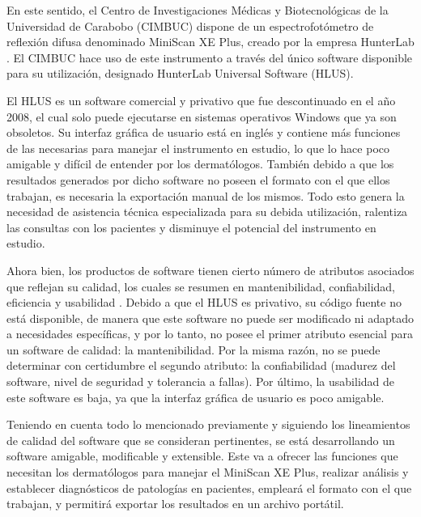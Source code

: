 \documentclass[conference]{IEEEtran}
\begin{document}
En este sentido, el Centro de Investigaciones M\'{e}dicas y Biotecnol\'{o}gicas de la Universidad de Carabobo \mbox{(CIMBUC)} dispone de un espectrofot\'{o}metro de reflexi\'{o}n difusa \mbox{denominado} MiniScan XE Plus, creado por la empresa HunterLab \cite{HunterLab}. El CIMBUC hace uso de este instrumento a trav\'{e}s del \'{u}nico software disponible para su utilizaci\'{o}n, designado HunterLab Universal Software (HLUS)\cite{HunterLab-manual}.

El HLUS es un software \mbox{comercial} y privativo que fue descontinuado en el a\~{n}o 2008, el cual solo puede ejecutarse en \mbox{sistemas} \mbox{operativos} Windows que ya son obsoletos. Su interfaz gr\'{a}fica de usuario est\'{a} en ingl\'{e}s y contiene m\'{a}s funciones de las necesarias para manejar el instrumento en estudio, lo que lo hace poco amigable y dif\'{i}cil de entender por los dermat\'{o}logos. Tambi\'{e}n debido a que los resultados generados por dicho software no poseen el formato con el que ellos trabajan, es necesaria la exportaci\'{o}n manual de los mismos. Todo esto genera la necesidad de asistencia t\'{e}cnica especializada para su debida utilizaci\'{o}n, ralentiza las consultas con los pacientes y disminuye el potencial del instrumento en estudio.

Ahora bien, los productos de software tienen cierto n\'{u}mero de atributos asociados que reflejan su calidad, los cuales se resumen en mantenibilidad, confiabilidad, eficiencia y usabilidad \cite{Sommerville}. Debido a que el HLUS es \mbox{privativo}, su c\'{o}digo fuente no est\'{a} disponible, de manera que este software no puede ser modificado ni adaptado a necesidades espec\'{i}ficas, y por lo tanto, no posee el primer atributo esencial para un software de calidad: la mantenibilidad. Por la misma raz\'{o}n, no se puede determinar con certidumbre el segundo atributo: la confiabilidad (madurez del software, nivel de seguridad y tolerancia a fallas). Por \'{u}ltimo, la usabilidad de este software es baja, ya que la interfaz gr\'{a}fica de usuario es poco amigable.

Teniendo en cuenta todo lo mencionado previamente y siguiendo los lineamientos de calidad del \mbox{software} que se consideran pertinentes, se est\'{a} desarrollando un \mbox{software} amigable, modificable y extensible. Este va a ofrecer las funciones que necesitan los dermat\'{o}logos para manejar el MiniScan XE Plus, realizar an\'{a}lisis y establecer \mbox{diagn\'{o}sticos} de patolog\'{i}as en pacientes, emplear\'{a} el formato con el que trabajan, y permitir\'{a} exportar los resultados en un archivo port\'{a}til. 
\end{document}

